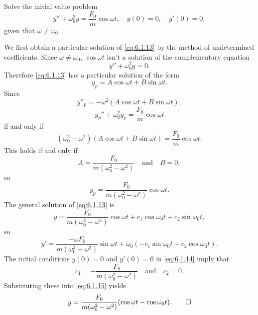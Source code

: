 \begin{example}\label{example:6.1.4}
 Solve the initial value problem
\begin{equation}\label{eq:6.1.14}
y''+\omega_0^2y=\frac{F_0}{m}\cos\omega t, \quad  y(0)=0,\quad y'(0)=0,
\end{equation}
 given that $\omega\ne\omega_0$.
\end{example}


\begin{solution}
We first obtain a particular solution of \eqref{eq:6.1.13} by the method
of undetermined coefficients. Since $\omega\ne\omega _0$,
 $\cos\omega t$ isn't  a solution of the complementary equation
\[
y''+\omega_0^2y=0.
\]
Therefore \eqref{eq:6.1.13} has a particular solution of the form
\[
y_p=A\cos\omega t+B\sin\omega t.
\]
Since
\[
y''_p=-\omega^2(A\cos\omega t+B\sin\omega t),
\]
\[
y_p''+\omega_0^2y_p=\frac{F_0}{m}\cos\omega t
\]
if and only if
\[
(\omega_0^2-\omega^2)\left(A\cos\omega t+
B\sin\omega t\right)=\frac{F_0}{m}\cos\omega t.
\]
 This holds if and only if
\[
A=\frac{F_0}{m(\omega_0^2-\omega^2)}\quad\text{and}\quad  B=0,
\]
so
\[
y_p=\frac{F_0}{m(\omega_0^2-\omega^2)}\cos\omega t.
\]
The general solution of \eqref{eq:6.1.13}  is
\begin{equation}\label{eq:6.1.15}
y=\frac{F_0}{m(\omega_0^2-\omega^2)}\cos\omega t
+c_1\cos\omega_0 t+c_2\sin\omega_0t,
\end{equation}
so
\[
y'=\frac{-\omega F_0}{m(\omega_0^2-\omega^2)}\sin\omega t
+\omega_0(-c_1\sin\omega_0 t+c_2\cos\omega_0t).
\]
The initial conditions $y(0)=0$ and $y'(0)=0$ in \eqref{eq:6.1.14} imply
that
\[
c_1=-\frac{F_0}{m(\omega_0^2-\omega^2)}\quad\text{and}\quad 
c_2=0.
\]
Substituting these into \eqref{eq:6.1.15} yields
\begin{equation}\label{eq:6.1.16}
y=\frac{F_0}{m(\omega_0^2-\omega^2)}(\cos\omega t-\cos\omega_0t).\qedhere
\end{equation}
\end{solution}

